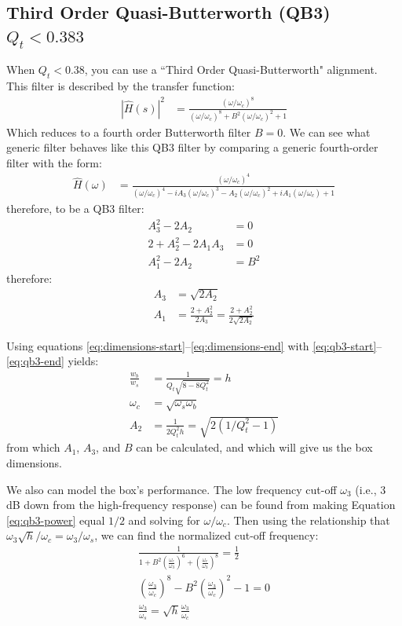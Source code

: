 \documentclass[10pt]{book}
\begin{document}
\subsection{Third Order Quasi-Butterworth (QB3) \texorpdfstring{\\$Q_t<0.383$}{Qt<0.383}} When $Q_t<0.38$, you can use a ``Third Order Quasi-Butterworth" alignment. This filter is described by the transfer function:
\begin{align}
\left| \hat{H}(s) \right|^2 &=\frac{(\omega/\omega_c)^8}{(\omega/\omega_c)^8+B^2(\omega/\omega_c)^2+1}
\end{align}
Which reduces to a fourth order Butterworth filter $B=0$. We can see what generic filter behaves like this QB3 filter by comparing a generic fourth-order filter with the form:
\begin{align}
\hat{H}(\omega) &=\frac{(\omega/\omega_c)^4}{(\omega/\omega_c)^4-iA_3(\omega/\omega_c)^3-A_2(\omega/\omega_c)^2+iA_1(\omega/\omega_c)+1}
\end{align}
therefore, to be a QB3 filter:
\begin{align}
A_3^2-2 A_2&=0\label{eq:qb3-start}\\
2+A_2^2-2 A_1 A_3&=0\\
A_1^2-2 A_2&=B^2\label{eq:qb3-end}
\end{align}
therefore:
\begin{align}
A_3&=\sqrt{2 A_2}\\
A_1&=\frac{2+A_2^2}{2 A_3}=\frac{2+A_2^2}{2 \sqrt{2 A_2}}
\end{align}

Using equations \ref{eq:dimensions-start}--\ref{eq:dimensions-end} with \ref{eq:qb3-start}--\ref{eq:qb3-end} yields:
\begin{align}
\frac{w_b}{w_s}&= \frac{1}{Q_t\sqrt{8-8Q_t^2}}=h\\
\omega_c&=\sqrt{\omega_s \omega_b}\\
A_2&=\frac{1}{2 Q_t^2 h}=\sqrt{2(1/Q_t^2-1)}\label{eq:qb3-power}
\end{align}
from which $A_1$, $A_3$, and $B$ can be calculated, and which will give us the box dimensions.

We also can model the box's performance. The low frequency cut-off $\omega_3$ (i.e., 3 dB down from the high-frequency response) can be found from making Equation \ref{eq:qb3-power} equal $1/2$ and solving for $\omega/\omega_c$. Then using the relationship that $\omega_3\sqrt{h}/\omega_c=\omega_3/\omega_s$, we can find the normalized cut-off frequency:
\begin{align}
\frac{1}{1+B^2\left( \frac{\omega_c}{\omega_3} \right)^6+\left( \frac{\omega_c}{\omega_3} \right)^8}=\frac{1}{2}\\
\left( \frac{\omega_3}{\omega_c} \right)^8-B^2\left( \frac{\omega_3}{\omega_c} \right)^2-1=0\\
\frac{\omega_3}{\omega_s}=\sqrt{h}\frac{\omega_3}{\omega_c}
\end{align}
\end{document}
